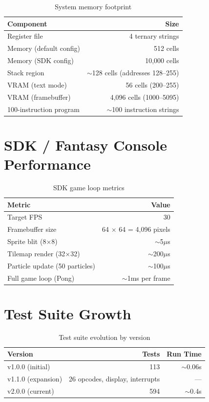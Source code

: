 \documentclass[12pt,a4paper,twoside]{book}
\theoremstyle{trinarytheorem}
\theoremstyle{trinarydefinition}
\begin{document}
\begin{table}[H]
\centering
\caption{System memory footprint}
\label{app:memusage}
\begin{tabular}{lr}
\toprule
Component & Size \\
\midrule
Register file & 4 ternary strings \\
Memory (default config) & 512 cells \\
Memory (SDK config) & 10,000 cells \\
Stack region & $\sim$128 cells (addresses 128--255) \\
VRAM (text mode) & 56 cells (200--255) \\
VRAM (framebuffer) & 4,096 cells (1000--5095) \\
100-instruction program & $\sim$100 instruction strings \\
\bottomrule
\end{tabular}
\end{table}

\section{SDK / Fantasy Console Performance}

\begin{table}[H]
\centering
\caption{SDK game loop metrics}
\label{app:sdkperf}
\begin{tabular}{lr}
\toprule
Metric & Value \\
\midrule
Target FPS & 30 \\
Framebuffer size & 64 $\times$ 64 = 4,096 pixels \\
Sprite blit (8$\times$8) & $\sim$5$\mu$s \\
Tilemap render (32$\times$32) & $\sim$200$\mu$s \\
Particle update (50 particles) & $\sim$100$\mu$s \\
Full game loop (Pong) & $\sim$1ms per frame \\
\bottomrule
\end{tabular}
\end{table}

\section{Test Suite Growth}

\begin{table}[H]
\centering
\caption{Test suite evolution by version}
\label{app:testgrowth}
\begin{tabular}{lrr}
\toprule
Version & Tests & Run Time \\
\midrule
v1.0.0 (initial) & 113 & $\sim$0.06s \\
v1.1.0 (expansion) & 26 opcodes, display, interrupts & --- \\
v2.0.0 (current) & 594 & $\sim$0.4s \\
\bottomrule
\end{tabular}
\end{table}
\end{document}
